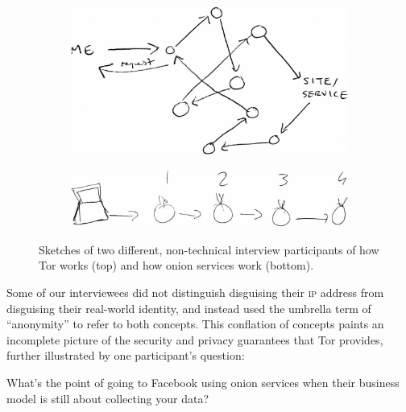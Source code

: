 \begin{figure}[t]
    \centering

    \begin{subfigure}[t]{\linewidth}
        \centering
        \includegraphics[width=0.8\linewidth]{figures/tor-sketch.jpg}
        \label{fig:tor-sketch}
    \end{subfigure}

    \begin{subfigure}[t]{\linewidth}
        \centering
        \includegraphics[width=0.8\linewidth]{figures/os-sketch.jpg}
        \label{fig:os-sketch}
    \end{subfigure}

    \caption{Sketches of two different, non-technical interview participants of
    how Tor works (top) and how onion services work (bottom).}
\end{figure}

Some of our interviewees did not distinguish disguising their \textsc{ip}
address from disguising their real-world identity, and instead used the umbrella
term of ``anonymity'' to refer to both concepts.  This conflation of concepts
paints an incomplete picture of the security and privacy guarantees that Tor
provides, further illustrated by one participant's question:

\begin{displayquote}[P07]
What's the point of going to Facebook using onion services when their business
model is still about collecting your data?
\end{displayquote}


